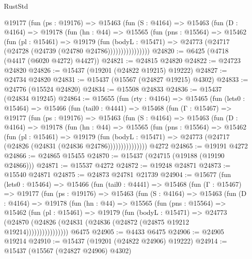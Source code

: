 \begin{lexlean}{RustStd}
\begin{coremodule}
            @19177
              (fun (ps : @19176) =>
              @15463
                (fun (S : @4164) =>
                @15463
                  (fun (D : @4164) =>
                  @19178
                    (fun (hn : @44) =>
                    @15565
                      (fun (pns : @15564) =>
                      @15462
                        (fun (pl : @15461) =>
                        @19179
                          (fun (bodyL : @15471) =>
                          @24773 (@24717 (@24728 (@24739 (@24780 @24786))))))))))))))))
@24820 := @6425 (@4718 (@4417 (@6020 @4272) @4427))
@24821 := @24815 @24820
@24822 := @24723 @24820
@24826 := @15437 (@19201 (@24822 @19215) @19222)
@24827 := @24734 @24820
@24831 := @15437 (@15567 (@24827 @19215) @4302)
@24833 := @24776 (@15524 @24820)
@24834 := @15508 @24833
@24836 := @15437 (@24834 @19245)
@24864 := @15655
    (fun (rty : @4164) =>
    @15465
      (fun (lets0 : @15464) =>
      @15466
        (fun (tail0 : @4441) =>
        @15468
          (fun (Γ : @15467) =>
          @19177
            (fun (ps : @19176) =>
            @15463
              (fun (S : @4164) =>
              @15463
                (fun (D : @4164) =>
                @19178
                  (fun (hn : @44) =>
                  @15565
                    (fun (pns : @15564) =>
                    @15462
                      (fun (pl : @15461) =>
                      @19179
                        (fun (bodyL : @15471) =>
                        @24773 (@24717 (@24826 (@24831 (@24836 @24786)))))))))))))))
    @4272
@24865 := @19191 @4272
@24866 := @24865 @15455
@24870 := @15437 (@24715 (@19188 (@19190 @24866)))
@24871 := @15537 @4272
@24872 := @19248 @24871
@24873 := @15540 @24871
@24875 := @24873 @24781 @21739
@24904 := @15677
    (fun (lets0 : @15464) =>
    @15466
      (fun (tail0 : @4441) =>
      @15468
        (fun (Γ : @15467) =>
        @19177
          (fun (ps : @19176) =>
          @15463
            (fun (S : @4164) =>
            @15463
              (fun (D : @4164) =>
              @19178
                (fun (hn : @44) =>
                @15565
                  (fun (pns : @15564) =>
                  @15462
                    (fun (pl : @15461) =>
                    @19179
                      (fun (bodyL : @15471) =>
                      @24773
                        (@24870
                          (@24826 (@24831 (@24836 (@24872 (@24875 @19212 @19214))))))))))))))))
    @6475
@24905 := @4433 @6475
@24906 := @24905 @19214
@24910 := @15437 (@19201 (@24822 @24906) @19222)
@24914 := @15437 (@15567 (@24827 @24906) @4302)

\end{coremodule}
\end{lexlean}
